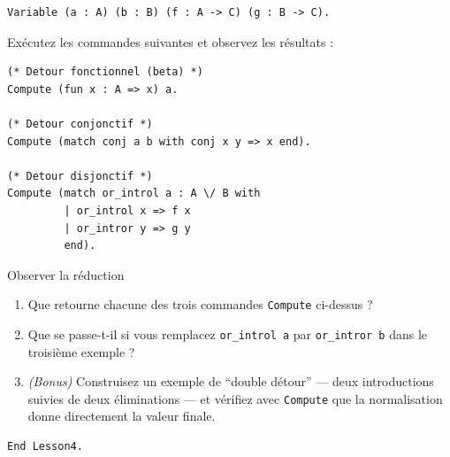 \documentclass[11pt,a4paper]{article}
\begin{document}
\begin{lstlisting}
Variable (a : A) (b : B) (f : A -> C) (g : B -> C).
\end{lstlisting}

Exécutez les commandes suivantes et observez les résultats :

\begin{lstlisting}
(* Detour fonctionnel (beta) *)
Compute (fun x : A => x) a.

(* Detour conjonctif *)
Compute (match conj a b with conj x y => x end).

(* Detour disjonctif *)
Compute (match or_introl a : A \/ B with
         | or_introl x => f x
         | or_intror y => g y
         end).
\end{lstlisting}

\begin{exercice}{Observer la réduction}{}
  \begin{enumerate}
    \item Que retourne chacune des trois commandes \texttt{Compute} ci-dessus ?
    \item Que se passe-t-il si vous remplacez \texttt{or\_introl~a} par \texttt{or\_intror~b} dans le troisième exemple ?
    \item \textit{(Bonus)} Construisez un exemple de ``double détour'' — deux introductions suivies de deux éliminations — et vérifiez avec \texttt{Compute} que la normalisation donne directement la valeur finale.
  \end{enumerate}
\end{exercice}

\begin{lstlisting}
End Lesson4.
\end{lstlisting}
\end{document}
